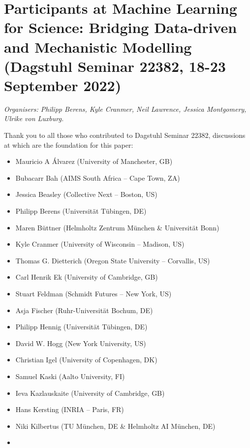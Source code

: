 \section{Participants at Machine Learning for Science: Bridging
Data-driven and Mechanistic Modelling (Dagstuhl Seminar 22382, 18-23
September
2022)}\label{annex-1-participants-at-machine-learning-for-science-bridging-data-driven-and-mechanistic-modelling-dagstuhl-seminar-22382-18-23-september-2022}

\emph{Organisers: Philipp Berens, Kyle Cranmer, Neil Lawrence, Jessica
Montgomery, Ulrike von Luxburg.}

Thank you to all those who contributed to Dagstuhl Seminar 22382,
discussions at which are the foundation for this paper:

\begin{itemize}
    \item 
    Mauricio A Álvarez (University of Manchester, GB)
    \item
    Bubacarr Bah (AIMS South Africa -- Cape Town, ZA)
    \item
    Jessica Beasley (Collective Next -- Boston, US)
    \item
    Philipp Berens (Universität Tübingen, DE)
    \item
    Maren Büttner (Helmholtz Zentrum München \& Universität Bonn)
    \item
    Kyle Cranmer (University of Wisconsin -- Madison, US)
    \item
    Thomas G. Dietterich (Oregon State University -- Corvallis, US)
    \item
    Carl Henrik Ek (University of Cambridge, GB)
    \item
    Stuart Feldman (Schmidt Futures -- New York, US)
    \item
    Asja Fischer (Ruhr-Universität Bochum, DE)
    \item
    Philipp Hennig (Universität Tübingen, DE)
    \item
    David W. Hogg (New York University, US)
    \item
    Christian Igel (University of Copenhagen, DK)
    \item
    Samuel Kaski (Aalto University, FI)
    \item
    Ieva Kazlauskaite (University of Cambridge, GB)
    \item
    Hans Kersting (INRIA -- Paris, FR)
    \item
    Niki Kilbertus (TU München, DE \& Helmholtz AI München, DE)
    \item

\end{itemize}
